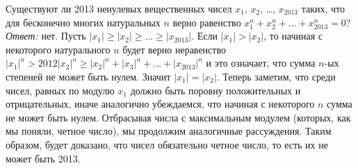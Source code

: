 \problem{}
Существуют ли 2013 ненулевых вещественных чисел
$x_1$, $x_2$, \ldots, $x_{2013}$ таких,
что для бесконечно многих натуральных $n$
верно равенство $x_1^n + x_2^n + \ldots + x_{2013}^n = 0$?
\solution
\emph{Ответ:} нет.
Пусть $|x_1| \geq |x_2| \geq \ldots \geq |x_{2013}|$.
Если $|x_1| > |x_2|$, то начиная с некоторого натурального $n$ будет верно
неравенство
$|x_1|^n > 2012 |x_2|^n \geq |x_2|^n + |x_3|^n + \ldots + |x_{2013}|^n$
и это означает, что сумма $n$-ых степеней не может быть нулем.
Значит $|x_1| = |x_2|$.
Теперь заметим, что среди чисел, равных по модулю $x_1$ должно быть поровну
положительных и отрицательных, иначе аналогично убеждаемся, что начиная с
некоторого $n$ сумма не может быть нулем.
Отбрасывая числа с максимальным модулем (которых, как мы поняли, четное число),
мы продолжим аналогичные рассуждения.
Таким образом, будет доказано, что чисел обязательно четное число, то есть их
не может быть 2013.
\endproblem
